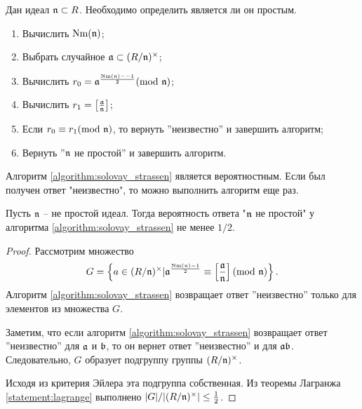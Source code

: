 \documentclass[_dissertation.tex]{subfiles}
\begin{document}
\begin{algorithm}\label{algorithm:solovay_strassen}
    Дан идеал $\mathfrak{n} \subset R$.
    Необходимо определить является ли он простым.

    \begin{enumerate}
        \item Вычислить $\textrm{Nm}(\mathfrak{n})$;
        
        \item Выбрать случайное $\mathfrak{a} \subset (R/\mathfrak{n})^{\times}$;

        \item Вычислить $r_0 = \mathfrak{a}^{\frac{\textrm{Nm}(\mathfrak{n}) -- 1}{2}} (\textrm{mod } \mathfrak{n})$;

        \item Вычислить $r_1 = \left[\frac{\mathfrak{a}}{\mathfrak{n}}\right]$;

        \item Если $r_0 \equiv r_1 (\textrm{mod } \mathfrak{n})$, то вернуть ''неизвестно'' и завершить алгоритм;

        \item Вернуть ''$\mathfrak{n}$ не простой'' и завершить алгоритм.
    \end{enumerate}
\end{algorithm}

\begin{remark}
    Алгоритм \ref{algorithm:solovay_strassen} является вероятностным.
    Если был получен ответ "неизвестно", то можно выполнить алгоритм еще раз.
\end{remark}

\begin{proposition}
    Пусть $\mathfrak{n}$ -- не простой идеал.
    Тогда вероятность ответа "$\mathfrak{n}$ не простой" у алгоритма \ref{algorithm:solovay_strassen} не менее $1/2$.
\end{proposition}
\begin{proof}
    Рассмотрим множество
    \begin{equation*}
        G = \left\{
            a \in (R/\mathfrak{n})^{\times} | \mathfrak{a}^{\frac{\textrm{Nm}(\mathfrak{n}) - 1}{2}} \equiv \left[\frac{\mathfrak{a}}{\mathfrak{n}}\right](\textrm{mod } \mathfrak{n})
        \right\}.
    \end{equation*}
    Алгоритм \ref{algorithm:solovay_strassen} возвращает ответ ''неизвестно'' только для элементов из множества $G$.

    Заметим, что если алгоритм \ref{algorithm:solovay_strassen} возвращает ответ ''неизвестно'' для $\mathfrak{a}$ и $\mathfrak{b}$, то он вернет ответ ''неизвестно'' и для $\mathfrak{a}\mathfrak{b}$.
    Следовательно, $G$ образует подгруппу группы $(R/\mathfrak{n})^{\times}$.

    Исходя из критерия Эйлера эта подгруппа собственная.
    Из теоремы Лагранжа \ref{statement:lagrange} выполнено $|G|/|(R/\mathfrak{n})^{\times}| \le \frac{1}{2}$.
\end{proof}
\end{document}
